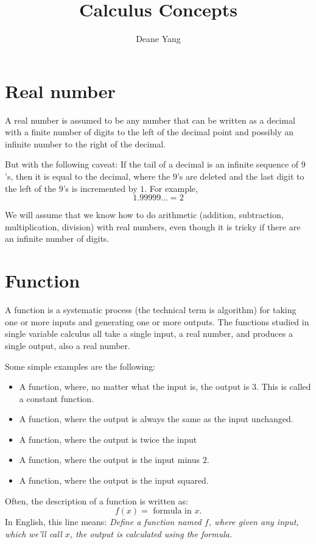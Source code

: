 \documentclass{math-deane}
\title{Calculus Concepts}
\author{Deane Yang}
\begin{document}
\maketitle

\section{Real number}

A real number is assumed to be any number that can be written as a decimal with a finite number of digits to the left of the decimal point and possibly an infinite number to the right of the decimal.

But with the following caveat: If the tail of a decimal is an infinite sequence of $9$'s, then it is equal to the decimal, where the $9$'s are deleted and the last digit to the left of the $9$'s is incremented by $1$. For example,
\[ 1.99999\dots = 2 \]

We will assume that we know how to do arithmetic (addition, subtraction, multiplication, division) with real numbers, even though it is tricky if there are an infinite number of digits.

\section{Function}

A function is a systematic process (the technical term is algorithm) for taking one or more inputs and generating one or more outputs. The functions studied in single variable calculus all take a single input, a real number, and produces a single output, also a real number.

Some simple examples are the following:
\begin{itemize}
\item A function, where, no matter what the input is, the output is $3$. This is called a constant function.
\item A function, where the output is always the same as the input unchanged.
\item A function, where the output is twice the input
\item A function, where the output is the input minus $2$.
\item A function, where the output is the input squared.
\end{itemize}

Often, the description of a function is written as:
\[ f(x) = \text{ formula in }x. \]
In English, this line means: {\em Define a function named $f$, where given any input, which we'll call $x$, the output is calculated using the formula.}
\end{document}
